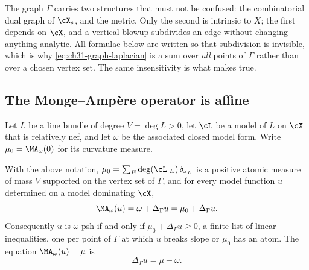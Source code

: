 \begin{remark}
\label{rem:ch31-lengths}
The graph \(\Gamma\) carries two structures that must not be confused: the
combinatorial dual graph of \(\cX_s\), and the metric.  Only the second is
intrinsic to \(X\); the first depends on \(\cX\), and a vertical blowup
subdivides an edge without changing anything analytic.  All formulae below
are written so that subdivision is invisible, which is why
\eqref{eq:ch31-graph-laplacian} is a sum over \emph{all} points of
\(\Gamma\) rather than over a chosen vertex set.  The same insensitivity is
what makes  true.
\end{remark}

\subsection{The Monge--Amp\`ere operator is affine}
\label{sec:ch31-curve-affine}

Let \(L\) be a line bundle of degree \(V=\deg L>0\), let \(\cL\) be a model
of \(L\) on \(\cX\) that is relatively nef, and let \(\omega\) be the
associated closed model form.  Write
\(\mu_0=\MA_\omega(0)\) for its curvature measure.

\begin{lemma}
\label{lem:ch31-curve-ma-affine}
With the above notation, \(\mu_0=\sum_E\deg(\cL|_E)\,\delta_{x_E}\) is a
positive atomic measure of mass \(V\) supported on the vertex set of
\(\Gamma\), and for every model function \(u\) determined on a model
dominating \(\cX\),
\begin{equation}
                         \MA_\omega(u)=\omega+\Delta_\Gamma u
                         =\mu_0+\Delta_\Gamma u .
\label{eq:curve-ma-laplacian}
\end{equation}
Consequently \(u\) is \(\omega\)-psh if and only if
\(\mu_0+\Delta_\Gamma u\geq0\), a finite list of linear inequalities, one
per point of \(\Gamma\) at which \(u\) breaks slope or \(\mu_0\) has an
atom.  The equation \(\MA_\omega(u)=\mu\) is
\begin{equation}
                         \Delta_\Gamma u=\mu-\omega .
\label{eq:curve-poisson}
\end{equation}
\end{lemma}

